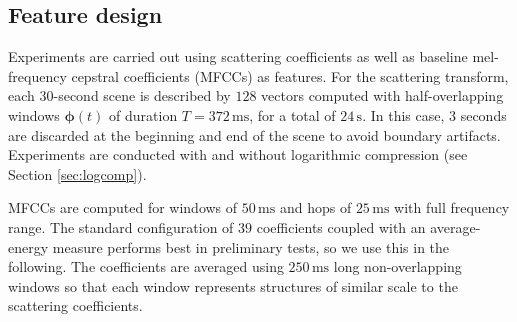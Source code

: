 \documentclass[smallextended]{svjour3}
\newcommand{\ja}[1]{\textcolor{magenta}{Joakim : #1}}
\begin{document}


\subsection{Feature design}

Experiments are carried out using scattering coefficients as well as baseline mel-frequency cepstral coefficients (MFCCs) as features. For the scattering transform, each $30$-second scene is described by $128$ vectors computed with half-overlapping windows $\boldsymbol{\phi}(t)$ of duration $T=372\,\mathrm{ms}$, for a total of $24\,\mathrm{s}$. In this case, $3$ seconds are discarded at the beginning and end of the scene to avoid boundary artifacts. Experiments are conducted with and without logarithmic compression (see Section \ref{sec:logcomp}).

MFCCs are computed for windows of $50\,\mathrm{ms}$ and hops of $25\,\mathrm{ms}$ with full frequency range. The standard configuration of $39$ coefficients coupled with an average-energy measure performs best in preliminary tests, so we use this in the following. The coefficients are averaged using $250\,\mathrm{ms}$ long non-overlapping windows so that each window represents structures of similar scale to the scattering coefficients.

\end{document}

